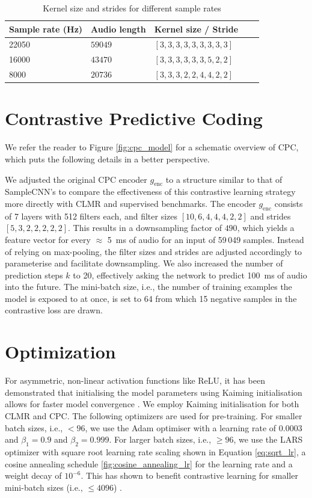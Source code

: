 \begin{table}
    \centering
        \begin{tabular}{lllll}\toprule
        Sample rate (Hz) & Audio length & Kernel size / Stride & \\\midrule
        22050 & $59049$  & $[3, 3, 3, 3, 3, 3, 3, 3, 3]$ \\
        16000 & $43470$ & $[3, 3, 3, 3, 3, 3, 5, 2, 2]$ \\
        8000 & $20736$ & $[3, 3, 3, 2, 2, 4, 4, 2, 2]$ \\                       
        \bottomrule
        \end{tabular}
    \caption{Kernel size and strides for different sample rates}
    \label{tab:samplecnn_config}
\end{table}

\section{Contrastive Predictive Coding}
We refer the reader to Figure \ref{fig:cpc_model} for a schematic overview of CPC, which puts the following details in a better perspective.

We adjusted the original CPC encoder $g_{\mathrm{enc}}$ to a structure similar to that of SampleCNN's to compare the effectiveness of this contrastive learning strategy more directly with CLMR and supervised benchmarks.
The encoder $g_{\mathrm{enc}}$ consists of 7 layers with 512 filters each, and filter sizes $[10, 6, 4, 4, 4, 2, 2]$ and strides $[5, 3, 2, 2, 2, 2, 2]$.
This results in a downsampling factor of $490$, which yields a feature vector for every $\approx$ 5~ms of audio for an input of 59\,049 samples.
Instead of relying on max-pooling, the filter sizes and strides are adjusted accordingly to parameterise and facilitate downsampling.
We also increased the number of prediction steps $k$ to 20, effectively asking the network to predict 100~ms of audio into the future.
The mini-batch size, i.e., the number of training examples the model is exposed to at once, is set to 64 from which 15 negative samples in the contrastive loss are drawn.

\section{Optimization}
For asymmetric, non-linear activation functions like ReLU, it has been demonstrated that initialising the model parameters using Kaiming initialisation allows for faster model convergence \cite{he2015delving}.
We employ Kaiming initialisation for both CLMR and CPC. The following optimizers are used for pre-training. For smaller batch sizes, i.e., $< 96$, we use the Adam optimiser with a learning rate of $0.0003$ and $\beta_1 = 0.9$ and $\beta_2 = 0.999$. 
For larger batch sizes, i.e., $\geq 96$, we use the LARS optimizer with  square root learning rate scaling shown in Equation \ref{eq:sqrt_lr}, a cosine annealing schedule \ref{fig:cosine_annealing_lr} for the learning rate and a weight decay of $10^{-6}$.
This has shown to benefit contrastive learning for smaller mini-batch sizes (i.e., $\leq 4096$) \cite{chen_simple_2020}.


